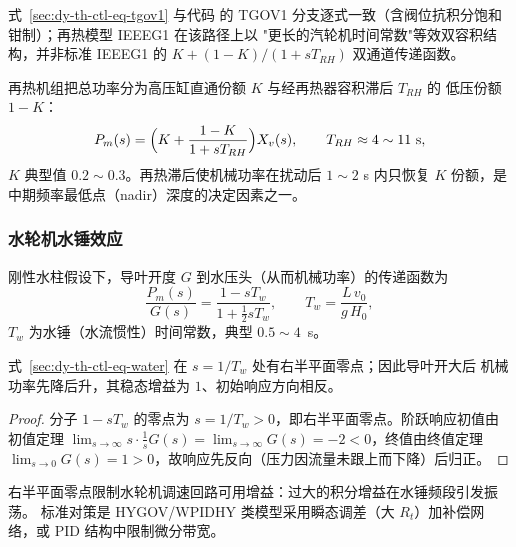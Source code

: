 \begin{remark}[实现口径]
式~\eqref{sec:dy-th-ctl-eq-tgov1} 与代码
的 TGOV1 分支逐式一致（含阀位抗积分饱和钳制）；再热模型 IEEEG1 在该路径上以
"更长的汽轮机时间常数"等效双容积结构，并非标准 IEEEG1 的
$K+(1-K)/(1+sT_{RH})$ 双通道传递函数。
\end{remark}

\begin{definition}
再热机组把总功率分为高压缸直通份额 $K$ 与经再热器容积滞后 $T_{RH}$ 的
低压份额 $1-K$：
\begin{equation}
P_m(s)=\Bigl(K+\frac{1-K}{1+sT_{RH}}\Bigr)X_v(s),
\qquad T_{RH}\approx4\sim11~\mathrm{s},
\label{sec:dy-th-ctl-eq-ieeeg1}
\end{equation}
$K$ 典型值 $0.2\sim0.3$。再热滞后使机械功率在扰动后 $1\sim2$ s 内只恢复 $K$
份额，是中期频率最低点（nadir）深度的决定因素之一。
\end{definition}

\subsubsection{水轮机水锤效应}

\begin{definition}[水锤传递函数]
刚性水柱假设下，导叶开度 $G$ 到水压头（从而机械功率）的传递函数为
\begin{equation}
\frac{P_m(s)}{G(s)}=\frac{1-sT_w}{1+\tfrac12 sT_w},
\qquad T_w=\frac{L\,v_0}{g\,H_0},
\label{sec:dy-th-ctl-eq-water}
\end{equation}
$T_w$ 为水锤（水流惯性）时间常数，典型 $0.5\sim4$~s。
\end{definition}

\begin{proposition}[水锤环节的非最小相位性]\label{sec:dy-th-ctl-prop-rhp}
式~\eqref{sec:dy-th-ctl-eq-water} 在 $s=1/T_w$ 处有右半平面零点；因此导叶开大后
机械功率先降后升，其稳态增益为 $1$、初始响应方向相反。
\end{proposition}

\begin{proof}
分子 $1-sT_w$ 的零点为 $s=1/T_w>0$，即右半平面零点。阶跃响应初值由初值定理
$\lim_{s\to\infty}s\cdot\frac1s G(s)=\lim_{s\to\infty}G(s)=-2<0$，终值由终值定理
$\lim_{s\to0}G(s)=1>0$，故响应先反向（压力因流量未跟上而下降）后归正。
\end{proof}

\begin{remark}[稳定含义]
右半平面零点限制水轮机调速回路可用增益：过大的积分增益在水锤频段引发振荡。
标准对策是 HYGOV/WPIDHY 类模型采用瞬态调差（大 $R_t$）加补偿网络，或
PID 结构中限制微分带宽。
\end{remark}

